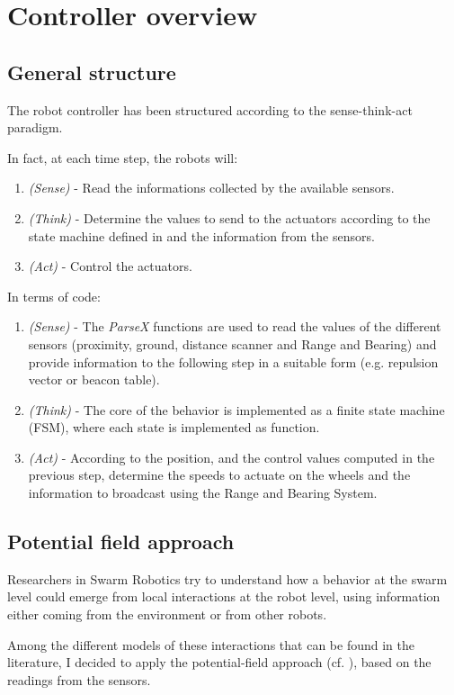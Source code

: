 \section{Controller overview}
\subsection{General structure}
The robot controller has been structured according to the sense-think-act paradigm.

In fact, at each time step, the robots will:
\begin{enumerate}
  \item \emph{(Sense)} - Read the informations collected by the available sensors.
  \item \emph{(Think)} - Determine the values to send to the actuators according to the state machine defined in  and the information from the sensors.
  \item \emph{(Act)} - Control the actuators.
\end{enumerate}

In terms of code:
\begin{enumerate}
  \item \emph{(Sense)} - The \emph{ParseX} functions are used to read the values of the different sensors (proximity, ground, distance scanner and Range and Bearing) and provide information to the following step in a suitable form (e.g. repulsion vector or beacon table).
  \item \emph{(Think)} - The core of the behavior is implemented as a finite state machine (FSM), where each state is implemented as function.
  \item \emph{(Act)} - According to the position, and the control values computed in the previous step, determine the speeds to actuate on the wheels and the information to broadcast using 
  the Range and Bearing System.
\end{enumerate}

\subsection{Potential field approach}
Researchers in Swarm Robotics try to understand how a behavior at the swarm level could emerge from local interactions at the robot level, using information either coming from the environment or from other robots.

Among the different models of these interactions that can be found in the literature, I decided to apply the potential-field approach (cf. \cite{howard2002mobile}), based on the readings from the sensors.

